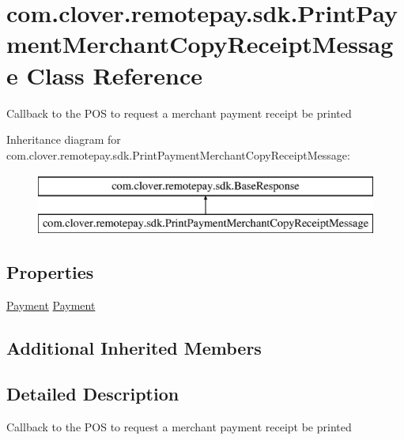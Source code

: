 \hypertarget{classcom_1_1clover_1_1remotepay_1_1sdk_1_1_print_payment_merchant_copy_receipt_message}{}\section{com.\+clover.\+remotepay.\+sdk.\+Print\+Payment\+Merchant\+Copy\+Receipt\+Message Class Reference}
\label{classcom_1_1clover_1_1remotepay_1_1sdk_1_1_print_payment_merchant_copy_receipt_message}


Callback to the P\+OS to request a merchant payment receipt be printed  


Inheritance diagram for com.\+clover.\+remotepay.\+sdk.\+Print\+Payment\+Merchant\+Copy\+Receipt\+Message\+:\begin{figure}[H]
\begin{center}
\leavevmode
\includegraphics[height=2.000000cm]{classcom_1_1clover_1_1remotepay_1_1sdk_1_1_print_payment_merchant_copy_receipt_message}
\end{center}
\end{figure}
\subsection*{Properties}
\begin{DoxyCompactItemize}
\item 
\hyperlink{classcom_1_1clover_1_1sdk_1_1v3_1_1payments_1_1_payment}{Payment} \hyperlink{classcom_1_1clover_1_1remotepay_1_1sdk_1_1_print_payment_merchant_copy_receipt_message_a79d99fc5d0cbbd8da1e30eb9e6d34f3f}{Payment}
\end{DoxyCompactItemize}
\subsection*{Additional Inherited Members}


\subsection{Detailed Description}
Callback to the P\+OS to request a merchant payment receipt be printed 



